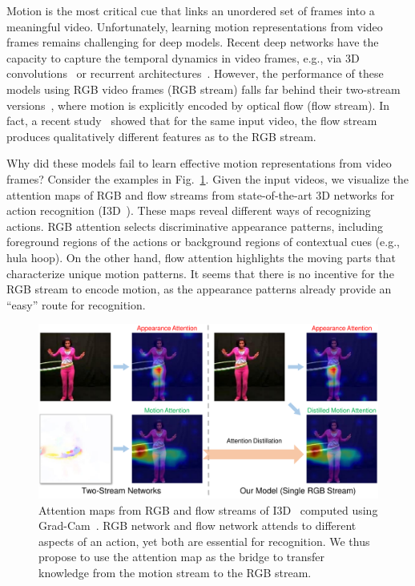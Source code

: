 \documentclass[10pt,twocolumn,letterpaper]{article}
\begin{document}
Motion is the most critical cue that links an unordered set of frames into a meaningful video. Unfortunately, learning motion representations from video frames remains challenging for deep models. Recent deep networks have the capacity to capture the temporal dynamics in video frames, e.g., via 3D convolutions~\cite{tran2015learning} or recurrent architectures~\cite{donahue2015long}. However, the performance of these models using RGB video frames (RGB stream) falls far behind their two-stream versions~\cite{donahue2015long,carreira2017quo}, where motion is explicitly encoded by optical flow (flow stream). In fact, a recent study~\cite{Feichtenhofer_2018_CVPR} showed that for the same input video, the flow stream produces qualitatively different features as to the RGB stream.

Why did these models fail to learn effective motion representations from video frames? Consider the examples in Fig.\ \ref{fig:teaser}. Given the input videos, we visualize the attention maps of RGB and flow streams from state-of-the-art 3D networks for action recognition (I3D~\cite{carreira2017quo}). These maps reveal different ways of recognizing actions. RGB attention selects discriminative appearance patterns, including foreground regions of the actions or background regions of contextual cues (e.g., hula hoop). On the other hand, flow attention highlights the moving parts that characterize unique motion patterns. It seems that there is no incentive for the RGB stream to encode motion, as the appearance patterns already provide an ``easy'' route for recognition. 

\begin{figure}[t]
\centering
\includegraphics[width=1.0\linewidth]{latex/figures/teaser_new.pdf}
\caption{Attention maps from RGB and flow streams of I3D~\cite{carreira2017quo} computed using Grad-Cam~\cite{selvaraju2017grad}. RGB network and flow network attends to different aspects of an action, yet both are essential for recognition. We thus propose to use the attention map as the bridge to transfer knowledge from the motion stream to the RGB stream.} 
\label{fig:teaser}
\vspace{-1.2em}
\end{figure}
\end{document}
